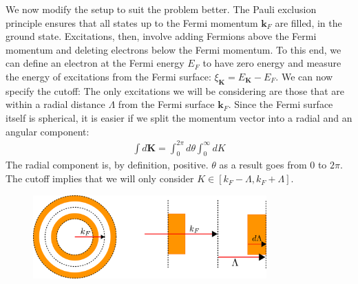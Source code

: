 \documentclass[14pt]{extarticle}
\begin{document}
We now modify the setup to suit the problem better. The Pauli exclusion principle ensures that all states up to the Fermi momentum \(\mathbf{k}_F\) are filled, in the ground state. Excitations, then, involve adding Fermions above the Fermi momentum and deleting electrons below the Fermi momentum. To this end, we can define an electron at the Fermi energy \(E_F\) to have zero energy and measure the energy of excitations from the Fermi surface: \(\xi_{\mathbf K} = E_{\mathbf K} - E_F\).
We can now specify the cutoff: The only excitations we will be considering are those that are within a radial distance \(\Lambda\) from the Fermi surface \(\mathbf{k}_F\). Since the Fermi surface itself is spherical, it is easier if we split the momentum vector into a radial and an angular component:
\begin{equation}\begin{aligned}
\int d\mathbf{K} = \int_0^{2\pi} d\theta \int_0^\infty dK
\end{aligned}\end{equation}
The radial component is, by definition, positive. \(\theta\) as a result goes from \(0\) to \(2\pi\). The cutoff implies that we will only consider \(K \in \left[k_F - \Lambda, k_F + \Lambda\right]\).

\begin{figure}[!htpb]
\centering
\includegraphics[width=0.8\textwidth]{./figures/fermi-rg.pdf}
\end{figure}
\end{document}
